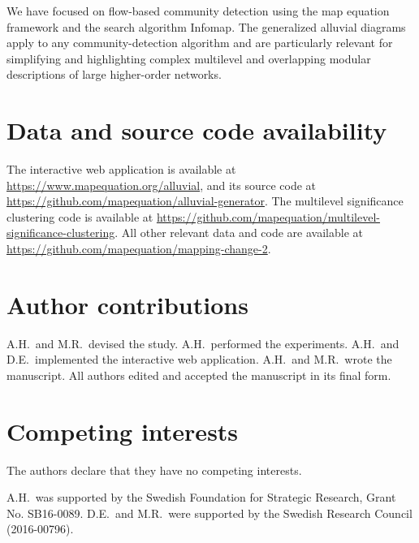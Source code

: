 \documentclass[aps,rmp,floats,floatfix,twocolumn,superscriptaddress,final]{revtex4-2}
\makeatletter
\newcommand*{\balancecolsandclearpage}{%
  \close@column@grid
  \cleardoublepage
  \twocolumngrid
}
\makeatother
\begin{document}
We have focused on flow-based community detection using the map equation framework and the search algorithm Infomap.
The generalized alluvial diagrams apply to any community-detection algorithm and are particularly relevant for simplifying and highlighting complex multilevel and overlapping modular descriptions of large higher-order networks.

\section*{Data and source code availability}

The interactive web application is available at {\small\url{https://www.mapequation.org/alluvial}}, and its source code at {\small\url{https://github.com/mapequation/alluvial-generator}}.
The multilevel significance clustering code is available at {\small\url{https://github.com/mapequation/multilevel-significance-clustering}}.
All other relevant data and code are available at {\small\url{https://github.com/mapequation/mapping-change-2}}.

\section*{Author contributions}

A.H.\ and M.R.\ devised the study.
A.H.\ performed the experiments.
A.H.\ and D.E.\ implemented the interactive web application.
A.H.\ and M.R.\ wrote the manuscript.
All authors edited and accepted the manuscript in its final form.

\section*{Competing interests}

The authors declare that they have no competing interests.

\acknowledgments

A.H.\ was supported by the Swedish Foundation for Strategic Research, Grant No. SB16-0089.
D.E.\ and M.R.\ were supported by the Swedish Research Council (2016-00796).



\balancecolsandclearpage

\renewcommand{\thesection}{SI}
\renewcommand{\thesubsection}{\arabic{subsection}}
\setcounter{figure}{0}
\renewcommand{\thefigure}{S\arabic{figure}}
\setcounter{lstlisting}{0}
\renewcommand{\thelstlisting}{S\arabic{lstlisting}}
\end{document}
